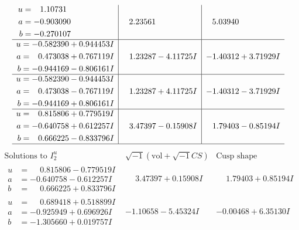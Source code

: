 \documentclass[1p]{elsarticle_modified}
\theoremstyle{definition}
\newcommand{\I}{\sqrt{-1}}
\begin{document}
$$\begin{array}{c|c|c}
\begin{aligned}
u &= \phantom{-}1.10731\phantom{ +0.000000I} \\
a &= -0.903090\phantom{ +0.000000I} \\
b &= -0.270107\phantom{ +0.000000I}\end{aligned}
 & \phantom{-}2.23561\phantom{ +0.000000I} & \phantom{-}5.03940\phantom{ +0.000000I} \\ \hline\begin{aligned}
u &= -0.582390 + 0.944453 I \\
a &= \phantom{-}0.473038 + 0.767119 I \\
b &= -0.944169 - 0.806161 I\end{aligned}
 & \phantom{-}1.23287 - 4.11725 I & -1.40312 + 3.71929 I \\ \hline\begin{aligned}
u &= -0.582390 - 0.944453 I \\
a &= \phantom{-}0.473038 - 0.767119 I \\
b &= -0.944169 + 0.806161 I\end{aligned}
 & \phantom{-}1.23287 + 4.11725 I & -1.40312 - 3.71929 I \\ \hline\begin{aligned}
u &= \phantom{-}0.815806 + 0.779519 I \\
a &= -0.640758 + 0.612257 I \\
b &= \phantom{-}0.666225 - 0.833796 I\end{aligned}
 & \phantom{-}3.47397 - 0.15908 I & \phantom{-}1.79403 - 0.85194 I\\
 \hline 
 \end{array}$$\newpage$$\begin{array}{c|c|c}  
\text{Solutions to }I^u_{2}& \I (\text{vol} + \sqrt{-1}CS) & \text{Cusp shape}\\
 \hline 
\begin{aligned}
u &= \phantom{-}0.815806 - 0.779519 I \\
a &= -0.640758 - 0.612257 I \\
b &= \phantom{-}0.666225 + 0.833796 I\end{aligned}
 & \phantom{-}3.47397 + 0.15908 I & \phantom{-}1.79403 + 0.85194 I \\ \hline\begin{aligned}
u &= \phantom{-}0.689418 + 0.518899 I \\
a &= -0.925949 + 0.696926 I \\
b &= -1.305660 + 0.019757 I\end{aligned}
 & -1.10658 - 5.45324 I & -0.00468 + 6.35130 I \\ \hline\begin{aligned}

\end{aligned}
\end{array}$$
\end{document}
